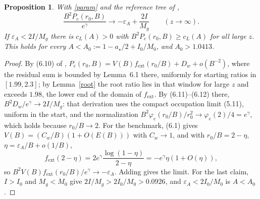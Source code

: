 \documentclass[11pt]{amsart}
\newtheorem{proposition}[lemma]{Proposition}
\newcommand{\Mg}{M_g}
\newcommand{\astar}{a_\star}
\newcommand{\fext}{f_{\mathrm{ext}}}
\newcommand{\eps}{\varepsilon}
\begin{document}
\begin{proposition}\label{margin}
With \eqref{param} and the reference tree of \cite{OAI},
\[
\frac{B^2P_e(r_0,B)}{e^{\gamma}}\longrightarrow-\eps_A+\frac{2I}{\Mg}\qquad(z\to\infty).
\]
If $\eps_A<2I/\Mg$ there is $c_L(A)>0$ with $B^2P_e(r_0,B)\ge c_L(A)$ for all large $z$. This holds for every $A<A_0:=1-\astar/2+I_0/M_0$, and $A_0>1.0413$.
\end{proposition}
\begin{proof}
By (6.10) of \cite{OAI}, $P_e(r_0,B)=V(B)\fext(r_0/B)+D_w+o(B^{-2})$, where the residual sum is bounded by Lemma~6.1 there, uniformly for starting ratios in $[1.99,2.3]$; by Lemma~\ref{root} the root ratio lies in that window for large $z$ and exceeds $1.98$, the lower end of the domain of $\fext$. By (6.11)--(6.12) there, $B^2D_w/e^{\gamma}\to2I/\Mg$: that derivation uses the compact occupation limit (5.11), uniform in the start, and the normalization $B^2\varphi_e(r_0/B)/r_0^2\to\varphi_e(2)/4=e^{\gamma}$, which holds because $r_0/B\to2$. For the benchmark, (6.1) gives $V(B)=(C_w/B)(1+O(E(B)))$ with $C_w\to1$, and with $r_0/B=2-\eta$, $\eta=\eps_A/B+o(1/B)$,
\[
\fext(2-\eta)=2e^{\gamma}\frac{\log(1-\eta)}{2-\eta}=-e^{\gamma}\eta(1+O(\eta)),
\]
so $B^2V(B)\fext(r_0/B)/e^{\gamma}\to-\eps_A$. Adding gives the limit. For the last claim, $I>I_0$ and $\Mg<M_0$ give $2I/\Mg>2I_0/M_0>0.0926$, and $\eps_A<2I_0/M_0$ is $A<A_0$.
\end{proof}
\end{document}
